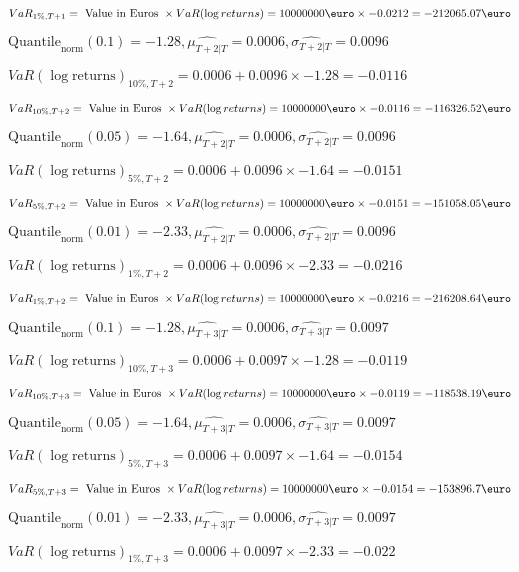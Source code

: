 $VaR_{1\%, T + 1} = \text{ Value in Euros } \times VaR(\log returns) = 10 000 000 \text{\euro} \times-0.0212 = -212065.07 \text{\euro}$


$\text{Quantile}_\text{norm}(0.1) = -1.28,\hat{\mu_{T+2|T}} = 0.0006, \hat{\sigma_{T+2|T}} = 0.0096$

$VaR(\log \text{returns})_{10\%, T + 2} = 0.0006 + 0.0096\times-1.28 = -0.0116$

$VaR_{10\%, T + 2} = \text{ Value in Euros } \times VaR(\log returns) = 10 000 000 \text{\euro} \times-0.0116 = -116326.52 \text{\euro}$


$\text{Quantile}_\text{norm}(0.05) = -1.64,\hat{\mu_{T+2|T}} = 0.0006, \hat{\sigma_{T+2|T}} = 0.0096$

$VaR(\log \text{returns})_{5\%, T + 2} = 0.0006 + 0.0096\times-1.64 = -0.0151$

$VaR_{5\%, T + 2} = \text{ Value in Euros } \times VaR(\log returns) = 10 000 000 \text{\euro} \times-0.0151 = -151058.05 \text{\euro}$


$\text{Quantile}_\text{norm}(0.01) = -2.33,\hat{\mu_{T+2|T}} = 0.0006, \hat{\sigma_{T+2|T}} = 0.0096$

$VaR(\log \text{returns})_{1\%, T + 2} = 0.0006 + 0.0096\times-2.33 = -0.0216$

$VaR_{1\%, T + 2} = \text{ Value in Euros } \times VaR(\log returns) = 10 000 000 \text{\euro} \times-0.0216 = -216208.64 \text{\euro}$


$\text{Quantile}_\text{norm}(0.1) = -1.28,\hat{\mu_{T+3|T}} = 0.0006, \hat{\sigma_{T+3|T}} = 0.0097$

$VaR(\log \text{returns})_{10\%, T + 3} = 0.0006 + 0.0097\times-1.28 = -0.0119$

$VaR_{10\%, T + 3} = \text{ Value in Euros } \times VaR(\log returns) = 10 000 000 \text{\euro} \times-0.0119 = -118538.19 \text{\euro}$


$\text{Quantile}_\text{norm}(0.05) = -1.64,\hat{\mu_{T+3|T}} = 0.0006, \hat{\sigma_{T+3|T}} = 0.0097$

$VaR(\log \text{returns})_{5\%, T + 3} = 0.0006 + 0.0097\times-1.64 = -0.0154$

$VaR_{5\%, T + 3} = \text{ Value in Euros } \times VaR(\log returns) = 10 000 000 \text{\euro} \times-0.0154 = -153896.7 \text{\euro}$


$\text{Quantile}_\text{norm}(0.01) = -2.33,\hat{\mu_{T+3|T}} = 0.0006, \hat{\sigma_{T+3|T}} = 0.0097$

$VaR(\log \text{returns})_{1\%, T + 3} = 0.0006 + 0.0097\times-2.33 = -0.022$

